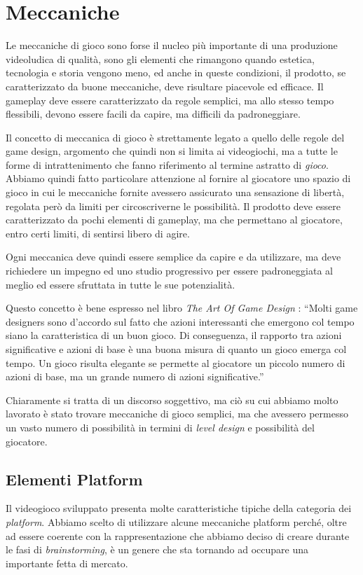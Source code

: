 \section{Meccaniche}
\label{sec:meccaniche}

Le meccaniche di gioco sono forse il nucleo più importante di una produzione videoludica di qualità, sono gli elementi che rimangono quando estetica, tecnologia e storia vengono meno, ed anche in queste condizioni, il prodotto, se caratterizzato da buone meccaniche, deve risultare piacevole ed efficace.
Il gameplay deve essere caratterizzato da regole semplici, ma allo stesso tempo flessibili, devono essere facili da capire, ma difficili da padroneggiare.

Il concetto di meccanica di gioco è strettamente legato a quello delle regole del game design, argomento che quindi non si limita ai videogiochi, ma a tutte le forme di intrattenimento che fanno riferimento al termine astratto di \textit{gioco}.
Abbiamo quindi fatto particolare attenzione al fornire al giocatore uno spazio di gioco in cui le meccaniche fornite avessero assicurato una sensazione di libertà, regolata però da limiti per circoscriverne le possibilità.
Il prodotto deve essere caratterizzato da pochi elementi di gameplay, ma che permettano al giocatore, entro certi limiti, di sentirsi libero di agire.

Ogni meccanica deve quindi essere semplice da capire e da utilizzare, ma deve richiedere un impegno ed uno studio progressivo per essere padroneggiata al meglio ed essere sfruttata in tutte le sue potenzialità.

Questo concetto è bene espresso nel libro \textit{The Art Of Game Design} \cite{artOfGameDesign}:
“Molti game designers sono d’accordo sul fatto che azioni interessanti che emergono col tempo siano la caratteristica di un buon gioco. Di conseguenza, il rapporto tra azioni significative e azioni di base è una buona misura di quanto un gioco emerga col tempo. Un gioco risulta elegante se permette al giocatore un piccolo numero di azioni di base, ma un grande numero di azioni significative.”

Chiaramente si tratta di un discorso soggettivo, ma ciò su cui abbiamo molto lavorato è stato trovare meccaniche di gioco semplici, ma che avessero permesso un vasto numero di possibilità in termini di \textit{level design} e possibilità del giocatore.

\subsection{Elementi Platform}
\label{platform}
Il videogioco sviluppato presenta molte caratteristiche tipiche della categoria dei \textit{platform}.
Abbiamo scelto di utilizzare alcune meccaniche platform perché, oltre ad essere coerente con la rappresentazione che abbiamo deciso di creare durante le fasi di \textit{brainstorming}, è un genere che sta tornando ad occupare una importante fetta di mercato. 


